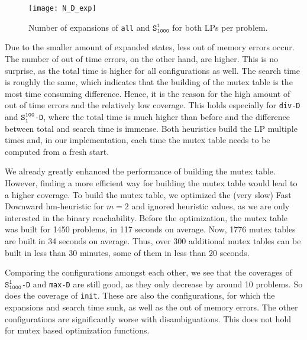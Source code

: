 \begin{figure}[h!]
\centering
\texttt{[image: N\_D\_exp]}
\caption{Number of expansions of \texttt{all} and $\texttt{S}_\texttt{1000}^\texttt{1}$ for both LPs per problem.}
\label{fig:N_D_exp}
\end{figure}

Due to the smaller amount of expanded states, less out of memory errors occur.
The number of out of time errors, on the other hand, are higher.
This is no surprise, as the total time is higher for all configurations as well.
The search time is roughly the same, which indicates that the building of the mutex table is the most time consuming difference.
Hence, it is the reason for the high amount of out of time errors and the relatively low coverage.
This holds especially for \texttt{div-D} and $\texttt{S}_\texttt{1}^\texttt{100}$\texttt{-D}, where the total time is much higher than before and the difference between total and search time is immense.
Both heuristics build the LP multiple times and, in our implementation, each time the mutex table needs to be computed from a fresh start.

We already greatly enhanced the performance of building the mutex table.
However, finding a more efficient way for building the mutex table would lead to a higher coverage.
To build the mutex table, we optimized the (very slow) Fast Downward hm-heuristic for $m=2$ and ignored heuristic values, as we are only interested in the binary reachability.
Before the optimization, the mutex table was built for 1450 problems, in 117 seconds on average.
Now, 1776 mutex tables are built in 34 seconds on average.
Thus, over 300 additional mutex tables can be built in less than 30 minutes, some of them in less than 20 seconds.

Comparing the configurations amongst each other, we see that the coverages of $\texttt{S}_\texttt{1000}^\texttt{1}$\texttt{-D} and \texttt{max-D} are still good, as they only decrease by around 10 problems.
So does the coverage of \texttt{init}.
These are also the configurations, for which the expansions and search time sunk, as well as the out of memory errors.
The other configurations are significantly worse with disambiguations.
This does not hold for mutex based optimization functions.

